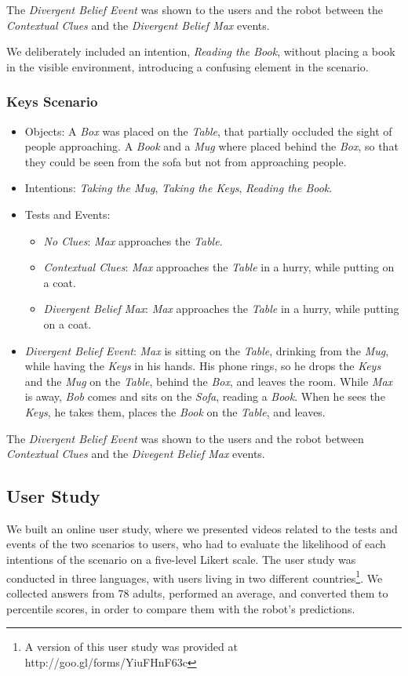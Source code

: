 The \textit{Divergent Belief Event} was shown to the users and the robot between the \textit{Contextual Clues} and the \textit{Divergent Belief Max} events. 

We deliberately included an intention, \textit{Reading the Book}, without placing a book in the visible environment, introducing a confusing element in the scenario.

\subsubsection{Keys Scenario}
\begin{itemize}
\item Objects: A \textit{Box} was placed on the \textit{Table}, that partially occluded the sight of people approaching. A \textit{Book} and a \textit{Mug} where placed behind the \textit{Box}, so that they could be seen from the sofa but not from approaching people.
\item Intentions: \textit{Taking the Mug}, \textit{Taking the Keys}, \textit{Reading the Book}.
\item Tests and Events:
\begin{itemize}
\item \textit{No Clues}: \textit{Max} approaches the \textit{Table}.
\item\textit{Contextual Clues}: \textit{Max} approaches the \textit{Table} in a hurry, while putting on a coat.
\item \textit{Divergent Belief Max}: \textit{Max} approaches the \textit{Table} in a hurry, while putting on a coat.
\end{itemize}
\item \textit{Divergent Belief Event}: \textit{Max} is sitting on the \textit{Table}, drinking from the \textit{Mug}, while having the \textit{Keys} in his hands. His phone rings, so he drops the \textit{Keys} and the \textit{Mug} on the \textit{Table}, behind the \textit{Box}, and leaves the room. While \textit{Max} is away, \textit{Bob} comes and sits on the \textit{Sofa}, reading a \textit{Book}. When he sees the \textit{Keys}, he takes them, places the \textit{Book} on the \textit{Table}, and leaves.
\end{itemize}

The \textit{Divergent Belief Event} was shown to the users and the robot between \textit{Contextual Clues} and the \textit{Divegent Belief Max} events.

\subsection{User Study}
We built an online user study, where we presented videos related to the tests and events of the two scenarios to users, who had to evaluate the likelihood of each intentions of the scenario
on a five-level Likert scale. The user study was conducted in three languages, with users living in two different countries\footnote{A version of this user study was provided at http://goo.gl/forms/YiuFHnF63c}. We collected answers from 78 adults, performed an average, and converted them to percentile scores, in order to compare them with the robot's predictions.

